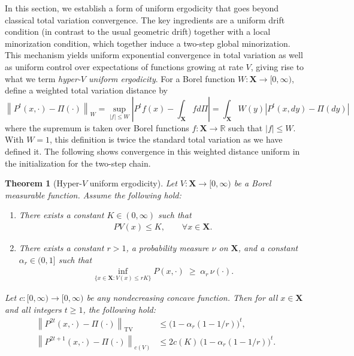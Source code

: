 \documentclass[ejsv2, noshowframe]{imsart}
\theoremstyle{plain}
\newtheorem{theorem}{Theorem}[section]
\theoremstyle{definition}
\theoremstyle{remark}
\newcommand{\norm}[1]{\left\lVert#1\right\rVert}
\newcommand{\R}{\mathbb{R}}
\renewcommand{\P}{P}
\newcommand{\X}{\textbf{X}}
\begin{document}
In this section, we establish a form of uniform ergodicity that goes beyond classical total variation convergence. The key ingredients are a uniform drift condition (in contrast to the usual geometric drift) together with a local minorization condition, which together induce a two-step global minorization. This mechanism yields uniform exponential convergence in total variation as well as uniform control over expectations of functions growing at rate $V$, giving rise to what we term \emph{hyper-$V$ uniform ergodicity}.
For a Borel function $W : \X \to [0, \infty)$, define a weighted total variation distance by
\[
\norm{\P^t(x, \cdot) - \Pi(\cdot)}_{W}
= \sup_{ |f| \le W} \left| \P^t f(x) - \int_{\X} f d\Pi \right|
= \int_{\X} W(y) | \P^t(x, dy) - \Pi(dy)|
\]
where the supremum is taken over Borel functions $f : \X \to \R$ such that $|f| \le W$.
With $W = 1$, this definition is twice the standard total variation as we have defined it. 
The following shows convergence in this weighted distance uniform in the initialization for the two-step chain.

\begin{theorem}[Hyper-$V$ uniform ergodicity] \label{thm:main}
Let $V : \X \to [0, \infty)$ be a Borel measurable function.
Assume the following hold:
\begin{enumerate}
\item
There exists a constant $K \in (0,\infty)$ such that
\begin{align}
P V(x) \le K, \qquad \forall x \in \X.
\label{eq:drift}
\end{align}

\item
There exists a constant $r > 1$, a probability measure $\nu$ on $\X$, and a constant $\alpha_r \in (0, 1]$ such that
\begin{align}
\inf_{\{x \in \X : V(x) \le rK\}} P(x, \cdot) \;\ge\; \alpha_r \, \nu(\cdot).
\label{eq:local_minorization}
\end{align}
\end{enumerate}
Let $c : [0, \infty) \to [0, \infty)$ be any nondecreasing concave function.
Then for all $x \in \X$ and all integers $t \ge 1$, the following hold:
\begin{align*}
\left\| P^{2t}(x, \cdot) - \Pi(\cdot) \right\|_{\mathrm{TV}}
&\le \big(1 - \alpha_r (1 - 1/r)\big)^t, \\[6pt]
\left\| P^{2t + 1}(x, \cdot) - \Pi(\cdot) \right\|_{c(V)}
&\le 2 c(K) \, \big(1 - \alpha_r (1 - 1/r)\big)^t.
\end{align*}
\end{theorem}
\end{document}
